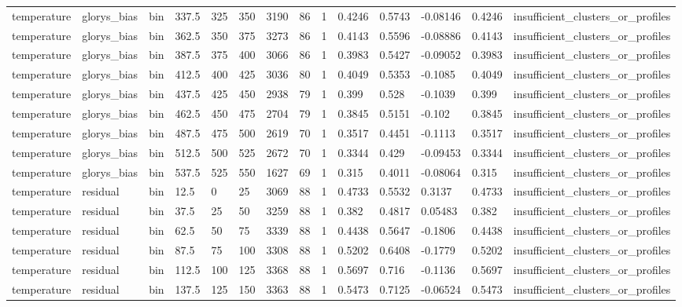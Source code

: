 \begin{table}[htbp]
\begin{tabular}{llllllllllllll}
temperature & glorys\_bias & bin & 337.5 & 325 & 350 & 3190 & 86 & 1 & 0.4246 & 0.5743 & -0.08146 & 0.4246 & insufficient\_clusters\_or\_profiles \\
temperature & glorys\_bias & bin & 362.5 & 350 & 375 & 3273 & 86 & 1 & 0.4143 & 0.5596 & -0.08886 & 0.4143 & insufficient\_clusters\_or\_profiles \\
temperature & glorys\_bias & bin & 387.5 & 375 & 400 & 3066 & 86 & 1 & 0.3983 & 0.5427 & -0.09052 & 0.3983 & insufficient\_clusters\_or\_profiles \\
temperature & glorys\_bias & bin & 412.5 & 400 & 425 & 3036 & 80 & 1 & 0.4049 & 0.5353 & -0.1085 & 0.4049 & insufficient\_clusters\_or\_profiles \\
temperature & glorys\_bias & bin & 437.5 & 425 & 450 & 2938 & 79 & 1 & 0.399 & 0.528 & -0.1039 & 0.399 & insufficient\_clusters\_or\_profiles \\
temperature & glorys\_bias & bin & 462.5 & 450 & 475 & 2704 & 79 & 1 & 0.3845 & 0.5151 & -0.102 & 0.3845 & insufficient\_clusters\_or\_profiles \\
temperature & glorys\_bias & bin & 487.5 & 475 & 500 & 2619 & 70 & 1 & 0.3517 & 0.4451 & -0.1113 & 0.3517 & insufficient\_clusters\_or\_profiles \\
temperature & glorys\_bias & bin & 512.5 & 500 & 525 & 2672 & 70 & 1 & 0.3344 & 0.429 & -0.09453 & 0.3344 & insufficient\_clusters\_or\_profiles \\
temperature & glorys\_bias & bin & 537.5 & 525 & 550 & 1627 & 69 & 1 & 0.315 & 0.4011 & -0.08064 & 0.315 & insufficient\_clusters\_or\_profiles \\
temperature & residual & bin & 12.5 & 0 & 25 & 3069 & 88 & 1 & 0.4733 & 0.5532 & 0.3137 & 0.4733 & insufficient\_clusters\_or\_profiles \\
temperature & residual & bin & 37.5 & 25 & 50 & 3259 & 88 & 1 & 0.382 & 0.4817 & 0.05483 & 0.382 & insufficient\_clusters\_or\_profiles \\
temperature & residual & bin & 62.5 & 50 & 75 & 3339 & 88 & 1 & 0.4438 & 0.5647 & -0.1806 & 0.4438 & insufficient\_clusters\_or\_profiles \\
temperature & residual & bin & 87.5 & 75 & 100 & 3308 & 88 & 1 & 0.5202 & 0.6408 & -0.1779 & 0.5202 & insufficient\_clusters\_or\_profiles \\
temperature & residual & bin & 112.5 & 100 & 125 & 3368 & 88 & 1 & 0.5697 & 0.716 & -0.1136 & 0.5697 & insufficient\_clusters\_or\_profiles \\
temperature & residual & bin & 137.5 & 125 & 150 & 3363 & 88 & 1 & 0.5473 & 0.7125 & -0.06524 & 0.5473 & insufficient\_clusters\_or\_profiles \\

\end{tabular}
\end{table}
